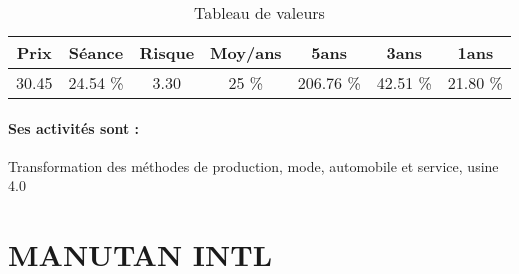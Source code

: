 \documentclass[11pt,a4paper]{report}%
\begin{document}
\begin{table}[H]
  \centering
    \begin{tabular}{|c|c|c|c|c|c|c|}
    \hline
    Prix & Séance & Risque  & Moy/ans & 5ans & 3ans & 1ans \\
    \hline
    30.45 &    24.54 \%    & 3.30 & 25 \% & 206.76 \% & 42.51 \% & 21.80 \% \\
    \hline
    \end{tabular}%
        \label{tab:table_LECTRA}%
      \caption{Tableau de valeurs}
\end{table}%

\paragraph{Ses activités sont : } Transformation des méthodes de production, mode, automobile et service, usine 4.0 
    
    \newpage

\section{MANUTAN INTL}
\end{document}
